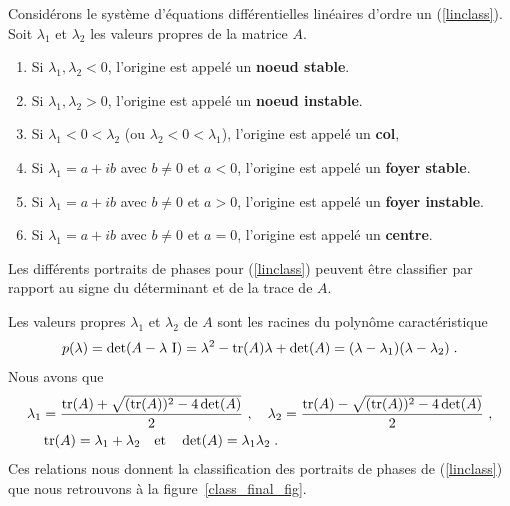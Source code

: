 {\begin{focus}{\dfn}
Considérons le système d'équations différentielles linéaires d'ordre un
(\ref{linclass}).   Soit $\lambda_1$ et $\lambda_2$ les valeurs
propres de la matrice $A$.
\begin{enumerate}
\item Si $\lambda_1, \lambda_2 < 0$, l'origine est appelé un 
  {\bfseries noeud stable}.
\item Si $\lambda_1, \lambda_2 > 0$, l'origine est appelé un 
  {\bfseries noeud instable}.
\item Si $\lambda_1 < 0 < \lambda_2$ (ou $\lambda_2 < 0 < \lambda_1$),
  l'origine est appelé un {\bfseries col},
\item Si $\lambda_1 = a + i b$ avec $b \neq 0$ et $a<0$, l'origine est
  appelé un {\bfseries foyer stable}.
\item Si $\lambda_1 = a + i b$ avec $b \neq 0$ et $a>0$, l'origine est
  appelé un {\bfseries foyer instable}.
\item Si $\lambda_1 = a + i b$ avec $b \neq 0$ et $a=0$, l'origine est
  appelé un {\bfseries centre}.
\end{enumerate}
\end{focus}

Les différents portraits de phases pour (\ref{linclass}) peuvent être
classifier par rapport au signe du déterminant et de la trace de
$A$.

Les valeurs propres $\lambda_1$ et $\lambda_2$ de $A$ sont les racines du
polynôme caractéristique
\[
p(\lambda) = \det(A-\lambda\,\operatorname{I})
= \lambda^2 - \operatorname{tr}(A) \lambda + \det(A)
= (\lambda - \lambda_1)(\lambda - \lambda_2) \; .
\]
Nous avons que
\begin{align*}
\lambda_1 &= \frac{\operatorname{tr}(A) + \sqrt{ (\operatorname{tr}(A))^2 - 4 \det(A) }}{2} \ , \quad
\lambda_2 = \frac{\operatorname{tr}(A) - \sqrt{ (\operatorname{tr}(A))^2 - 4 \det(A) }}{2} \ ,\\
&\operatorname{tr}(A) = \lambda_1+\lambda_2 \quad \text{et} \quad
\det(A) = \lambda_1\lambda_2 \; .
\end{align*}
Ces relations nous donnent la classification des portraits de
phases de (\ref{linclass}) que nous retrouvons à la
figure~\ref{class_final_fig}.

}
